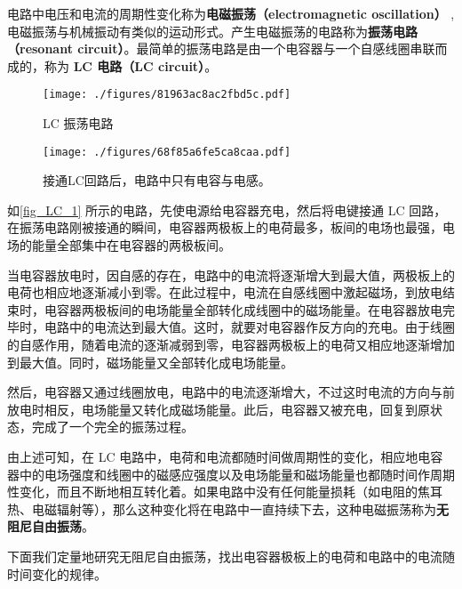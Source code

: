 

电路中电压和电流的周期性变化称为\textbf{电磁振荡（electromagnetic oscillation）} , 电磁振荡与机械振动有类似的运动形式。产生电磁振荡的电路称为\textbf{振荡电路（resonant circuit）}。最简单的振荡电路是由一个电容器与一个自感线圈串联而成的，称为\textbf{ LC 电路（LC circuit）}。
\begin{figure}[ht]
\centering
\texttt{[image: ./figures/81963ac8ac2fbd5c.pdf]}
\caption{LC 振荡电路} \label{fig_LC_1}
\end{figure}
\begin{figure}[ht]
\centering
\texttt{[image: ./figures/68f85a6fe5ca8caa.pdf]}
\caption{接通LC回路后，电路中只有电容与电感。} \label{fig_LC_3}
\end{figure}
如\autoref{fig_LC_1} 所示的电路，先使电源给电容器充电，然后将电键接通 LC 回路，在振荡电路刚被接通的瞬间，电容器两极板上的电荷最多，板间的电场也最强，电场的能量全部集中在电容器的两极板间。

当电容器放电时，因自感的存在，电路中的电流将逐渐增大到最大值，两极板上的电荷也相应地逐渐减小到零。在此过程中，电流在自感线圈中激起磁场，到放电结束时，电容器两极板间的电场能量全部转化成线圈中的磁场能量。在电容器放电完毕时，电路中的电流达到最大值。这时，就要对电容器作反方向的充电。由于线圈的自感作用，随着电流的逐渐减弱到零，电容器两极板上的电荷又相应地逐渐增加到最大值。同时，磁场能量又全部转化成电场能量。

然后，电容器又通过线圈放电，电路中的电流逐渐增大，不过这时电流的方向与前放电时相反，电场能量又转化成磁场能量。此后，电容器又被充电，回复到原状态，完成了一个完全的振荡过程。

由上述可知，在 LC 电路中，电荷和电流都随时间做周期性的变化，相应地电容器中的电场强度和线圈中的磁感应强度以及电场能量和磁场能量也都随时间作周期性变化，而且不断地相互转化着。如果电路中没有任何能量损耗（如电阻的焦耳热、电磁辐射等），那么这种变化将在电路中一直持续下去，这种电磁振荡称为\textbf{无阻尼自由振荡}。

下面我们定量地研究无阻尼自由振荡，找出电容器极板上的电荷和电路中的电流随时间变化的规律。

